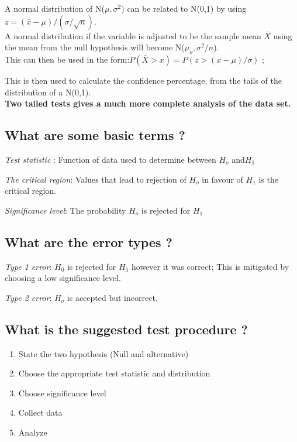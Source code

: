 \documentclass[11pt]{scrartcl} %
\begin{document}
A normal distribution of N(\(\mu, \sigma^2\)) can be related to N(0,1)
by using \(z = (\bar{x} - \mu)/ (\sigma/\sqrt{n})\).\\

A normal distribution if the variable is adjusted to be the sample mean
\(\bar{X}\) using the mean from the null hypothesis will become
N(\(\mu_o,\sigma^2/n\)).\\

This can then be used in the form:\(P(\bar{X} > x) = P(z > (x-\mu) /\sigma)\) ; 

This is then used to calculate the confidence percentage, from the tails of the distribution
of a N(0,1).\\

\textbf{Two tailed tests gives a much more complete analysis of the data
set.}

\subsection{What are some basic terms
?}

\emph{Test statistic} : Function of data used to determine between
\(H_o\) and\(H_1\)

\emph{The critical region}: Values that lead to rejection of \(H_o\) in
favour of \(H_1\) is the critical region.

\emph{Significance level}: The probability \(H_o\) is rejected for
\(H_1\)

\subsection{What are the error types
?}

\emph{Type 1 error}: \(H_0\) is rejected for \(H_1\) however it was
correct; This is mitigated by choosing a low significance level.

\emph{Type 2 error}: \(H_o\) is accepted but incorrect.

\subsection{What is the suggested test procedure
?}

\begin{enumerate}
\item State the two hypothesis (Null and alternative)
\item Choose the appropriate test statistic and distribution
\item Choose significance level
\item Collect data
\item Analyze
\end{enumerate}
\end{document}
